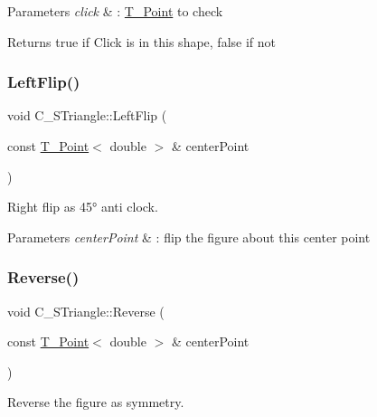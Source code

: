 \begin{DoxyParams}{Parameters}
{\em click} & \+: \hyperlink{classT__Point}{T\+\_\+\+Point} to check \\
\hline
\end{DoxyParams}
\begin{DoxyReturn}{Returns}
true if Click is in this shape, false if not 
\end{DoxyReturn}
\mbox{\label{classC__STriangle_aec7540d5750509269894dc4c906fc20f}} 
\subsubsection{\texorpdfstring{Left\+Flip()}{LeftFlip()}}
{\footnotesize\ttfamily void C\+\_\+\+S\+Triangle\+::\+Left\+Flip (\begin{DoxyParamCaption}\item[{const \hyperlink{classT__Point}{T\+\_\+\+Point}$<$ double $>$ \&}]{center\+Point }\end{DoxyParamCaption})}



Right flip as 45° anti clock. 


\begin{DoxyParams}{Parameters}
{\em center\+Point} & \+: flip the figure about this center point \\
\hline
\end{DoxyParams}
\mbox{\label{classC__STriangle_a3fafeed75d888024e95a494b8901e8fe}} 
\subsubsection{\texorpdfstring{Reverse()}{Reverse()}}
{\footnotesize\ttfamily void C\+\_\+\+S\+Triangle\+::\+Reverse (\begin{DoxyParamCaption}\item[{const \hyperlink{classT__Point}{T\+\_\+\+Point}$<$ double $>$ \&}]{center\+Point }\end{DoxyParamCaption})}



Reverse the figure as symmetry. 


